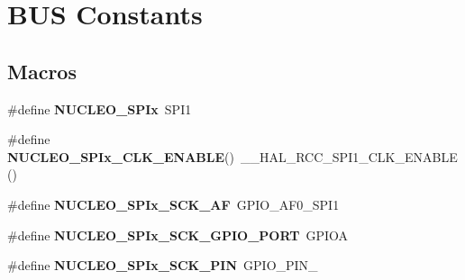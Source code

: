 \hypertarget{group___s_t_m32_f0_x_x___n_u_c_l_e_o___b_u_s}{}\section{B\+US Constants}
\label{group___s_t_m32_f0_x_x___n_u_c_l_e_o___b_u_s}
\subsection*{Macros}
\begin{DoxyCompactItemize}
\item 
\mbox{\label{group___s_t_m32_f0_x_x___n_u_c_l_e_o___b_u_s_ga0e3eaec0fd1b52881b3f1a8c3a616b56}} 
\#define {\bfseries N\+U\+C\+L\+E\+O\+\_\+\+S\+P\+Ix}~S\+P\+I1
\item 
\mbox{\label{group___s_t_m32_f0_x_x___n_u_c_l_e_o___b_u_s_gac55decc45d6cdc4ddc7eac3d5937366d}} 
\#define {\bfseries N\+U\+C\+L\+E\+O\+\_\+\+S\+P\+Ix\+\_\+\+C\+L\+K\+\_\+\+E\+N\+A\+B\+LE}()~\+\_\+\+\_\+\+H\+A\+L\+\_\+\+R\+C\+C\+\_\+\+S\+P\+I1\+\_\+\+C\+L\+K\+\_\+\+E\+N\+A\+B\+LE()
\item 
\mbox{\label{group___s_t_m32_f0_x_x___n_u_c_l_e_o___b_u_s_ga903193d6ec796bfe36017473cfad8a27}} 
\#define {\bfseries N\+U\+C\+L\+E\+O\+\_\+\+S\+P\+Ix\+\_\+\+S\+C\+K\+\_\+\+AF}~G\+P\+I\+O\+\_\+\+A\+F0\+\_\+\+S\+P\+I1
\item 
\mbox{\label{group___s_t_m32_f0_x_x___n_u_c_l_e_o___b_u_s_gaaa4ab0869e107f04615afba9f4273a6d}} 
\#define {\bfseries N\+U\+C\+L\+E\+O\+\_\+\+S\+P\+Ix\+\_\+\+S\+C\+K\+\_\+\+G\+P\+I\+O\+\_\+\+P\+O\+RT}~G\+P\+I\+OA
\item 
\mbox{\label{group___s_t_m32_f0_x_x___n_u_c_l_e_o___b_u_s_ga0d92d8772e55d5e6b851dfd3f8eb5086}} 
\#define {\bfseries N\+U\+C\+L\+E\+O\+\_\+\+S\+P\+Ix\+\_\+\+S\+C\+K\+\_\+\+P\+IN}~G\+P\+I\+O\+\_\+\+P\+I\+N\+\_
\item 
\mbox{\label{group___s_t_m32_f0_x_x___n_u_c_l_e_o___b_u_s_ga50787cbc0f3a8c5da82b4179a630714d}} 

\end{DoxyCompactItemize}
